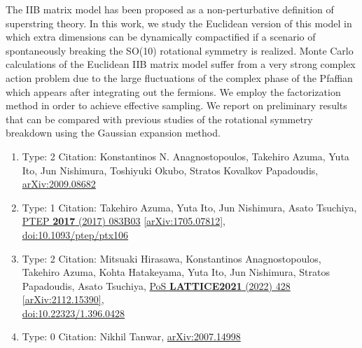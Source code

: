 \documentclass[a4paper,10pt]{article}
\begin{document}
\begin{enumerate}
The IIB matrix model has been proposed as a non-perturbative definition of superstring theory. In this work, we study the Euclidean version of this model in which extra dimensions can be dynamically compactified if a scenario of spontaneously breaking the SO(10) rotational symmetry is realized. Monte Carlo calculations of the Euclidean IIB matrix model suffer from a very strong complex action problem due to the large fluctuations of the complex phase of the Pfaffian which appears after integrating out the fermions. We employ the factorization method in order to achieve effective sampling. We report on preliminary results that can be compared with previous studies of the rotational symmetry breakdown using the Gaussian expansion method.
\begin{enumerate}
  \item Type: 2 Citation: Konstantinos N. Anagnostopoulos, Takehiro Azuma, Yuta Ito, Jun Nishimura, Toshiyuki Okubo, Stratos Kovalkov Papadoudis, \href{https://arxiv.org/abs/2009.08682}{arXiv:2009.08682}
  \item Type: 1 Citation: Takehiro Azuma, Yuta Ito, Jun Nishimura, Asato Tsuchiya, \href{https://www.doi.org/10.1093/ptep/ptx106}{PTEP {\bf 2017} (2017) 083B03}  \href{https://arxiv.org/abs/1705.07812}{[arXiv:1705.07812]},\\\href{https://www.doi.org/10.1093/ptep/ptx106}{doi:10.1093/ptep/ptx106}
  \item Type: 2 Citation: Mitsuaki Hirasawa, Konstantinos Anagnostopoulos, Takehiro Azuma, Kohta Hatakeyama, Yuta Ito, Jun Nishimura, Stratos Papadoudis, Asato Tsuchiya, \href{https://www.doi.org/10.22323/1.396.0428}{PoS {\bf LATTICE2021} (2022) 428}  \href{https://arxiv.org/abs/2112.15390}{[arXiv:2112.15390]},\\\href{https://www.doi.org/10.22323/1.396.0428}{doi:10.22323/1.396.0428}
  \item Type: 0 Citation: Nikhil Tanwar, \href{https://arxiv.org/abs/2007.14998}{arXiv:2007.14998}

\end{enumerate}
\end{enumerate}
\end{document}
